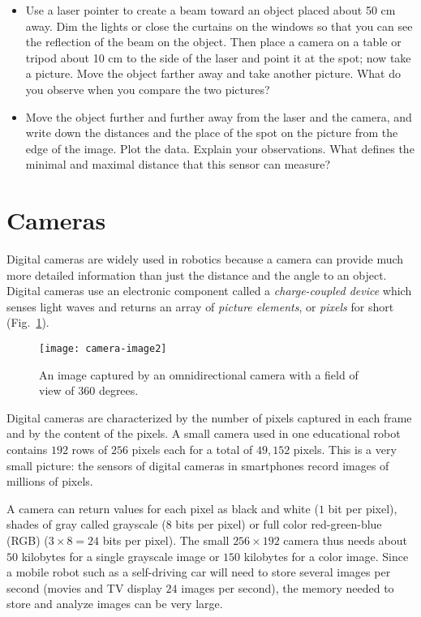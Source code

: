 \begin{framed}

\begin{itemize}
\item Use a laser pointer to create a beam toward an object placed about 50 cm away. Dim the lights or close the curtains on the windows so that you can see the reflection of the beam on the object. Then place a camera on a table or tripod about 10 cm to the side of the laser and point it at the spot; now take a picture. Move the object farther away and take another picture. What do you observe when you compare the two pictures?
\item Move the object further and further away from the laser and the camera, and write down the distances and the place of the spot on the picture from the edge of the image. Plot the data. Explain your observations. What defines the minimal and maximal distance that this sensor can measure?
\end{itemize}
\end{framed}

\section{Cameras}\label{s.cameras}

Digital cameras are widely used in robotics because a camera can provide much more detailed information than just the distance and the angle to an object. Digital cameras use an electronic component called a \emph{charge-coupled device} which senses light waves and returns an array of \emph{picture elements}, or \emph{pixels} for short (Fig.~\ref{fig.camera}).

\begin{figure}
\sidecaption
\texttt{[image: camera-image2]}
\caption{An image captured by an omnidirectional  camera with a field of view of 360 degrees.}\label{fig.camera}
\end{figure}

Digital cameras are characterized by the number of pixels captured in each frame and by the content of the pixels. A small camera used in one educational robot contains $192$ rows of $256$ pixels each for a total of $49,\!152$ pixels. This is a very small picture: the sensors of digital cameras in smartphones record images of millions of pixels.

A camera can return values for each pixel as black and white ($1$ bit per pixel), shades of gray called grayscale ($8$ bits per pixel) or full color red-green-blue (RGB) ($3\times 8=24$ bits per pixel). The small $256\times 192$ camera thus needs about $50$ kilobytes for a single grayscale image or $150$ kilobytes for a color image. Since a mobile robot such as a self-driving car will need to store several images per second (movies and TV display $24$ images per second), the memory needed to store and analyze images can be very large.

